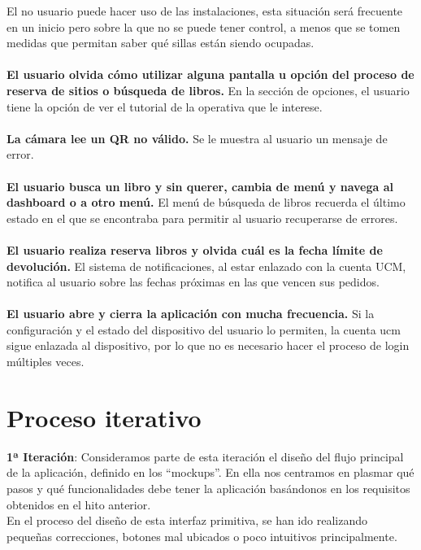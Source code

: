 \documentclass[12pt]{article}
\begin{document}
El no usuario puede hacer uso de las instalaciones, esta situación será frecuente en un inicio pero sobre la que no se puede tener control, a menos que se tomen medidas que permitan saber qué sillas están siendo ocupadas.
\\
\\
\textbf{El usuario olvida cómo utilizar alguna pantalla u opción del proceso de reserva de sitios o búsqueda de libros.}
En la sección de opciones, el usuario tiene la opción de ver el tutorial de la operativa que le interese.
\\
\\
\textbf{La cámara lee un QR no válido.}
Se le muestra al usuario un mensaje de error.
\\
\\
\textbf{El usuario busca un libro y sin querer, cambia de menú y navega al dashboard o a otro menú.}
El menú de búsqueda de libros recuerda el último estado en el que se encontraba para permitir al usuario recuperarse de errores.
\\
\\
\textbf{El usuario realiza reserva libros y olvida cuál es la fecha límite de devolución.}
El sistema de notificaciones, al estar enlazado con la cuenta UCM, notifica al usuario sobre las fechas próximas en las que vencen sus pedidos.
\\
\\
\textbf{El usuario abre y cierra la aplicación con mucha frecuencia.}
Si la configuración y el estado del dispositivo del usuario lo permiten, la cuenta ucm sigue enlazada al dispositivo, por lo que no es necesario hacer el proceso de login múltiples veces.


\section{Proceso iterativo}

\textbf{1ª Iteración}:
Consideramos parte de esta iteración el diseño del flujo principal de la aplicación,
definido en los “mockups”. En ella nos centramos en plasmar qué pasos y qué funcionalidades debe tener la aplicación basándonos en los requisitos obtenidos en el hito anterior. \\
\indent En el proceso del diseño de esta interfaz primitiva, se han ido realizando pequeñas
correcciones, botones mal ubicados o poco intuitivos principalmente.
\end{document}
